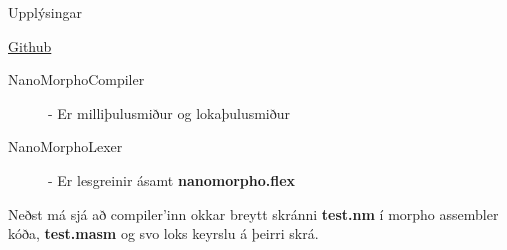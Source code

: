 \documentclass{homework}
\begin{document}

\begin{question}{Upplýsingar}
\end{question}
\begin{answer}
  \href{https://github.com/slowpokesheep/thydendur/tree/master/nanomorpho/nanomorpho}{Github}
  \begin{description}
    \item[NanoMorphoCompiler] - Er milliþulusmiður og lokaþulusmiður
    \item[NanoMorphoLexer] - Er lesgreinir ásamt \textbf{nanomorpho.flex}
  \end{description}
  Neðst má sjá að compiler'inn okkar breytt skránni \textbf{test.nm} í morpho assembler kóða, \textbf{test.masm} og svo loks keyrslu á þeirri skrá.
\end{answer}
\end{document}
